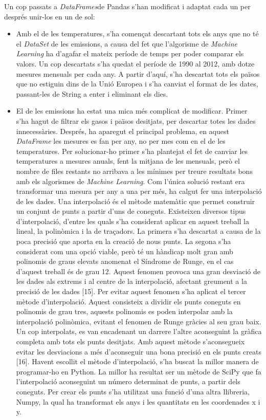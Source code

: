 \documentclass[10pt,a4paper,twocolumn,twoside]{article}
\begin{document}
Un cop passats a \textit{DataFrames}de Pandas s'han modificat i adaptat cada un per després unir-los en un de sol:
\begin{itemize}
\item Amb el de les temperatures, s'ha començat descartant tots els anys que no té el \textit{DataSet} de les emissions, a causa del fet que l'algorisme de \textit{Machine Learning} ha d'agafar el mateix període de temps per poder comparar els valors. Un cop descartats s'ha quedat el període de 1990 al 2012, amb dotze mesures mensuals per cada any. A partir d'aquí, s'ha descartat tots els països que no estiguin dins de la Unió Europea i s'ha canviat el format de les dates, passant-les de String a enter i eliminant els dies.
\item El de les emissions ha estat una mica més complicat de modificar. Primer s'ha hagut de filtrar els gasos i països desitjats, per descartar totes les dades innecessàries. Després, ha aparegut el principal problema, en aquest \textit{DataFrame} les mesures es fan per any, no per mes com en el de les temperatures. Per solucionar-ho primer s'ha plantejat el fet de canviar les temperatures a mesures anuals, fent la mitjana de les mensuals, però el nombre de files restants no arribava a les mínimes per treure resultats bons amb els algorismes de \textit{Machine Learning}. Com l'única solució restant era transformar una mesura per any a una per més, ha calgut fer una interpolació de les dades.
Una interpolació és el mètode matemàtic que permet construir un conjunt de punts a partir d'uns de coneguts. Existeixen diversos tipus d'interpolació, d'entre les quals s'ha considerat aplicar en aquest treball la lineal, la polinòmica i la de traçadors. La primera s'ha descartat a causa de la poca precisió que aporta en la creació de nous punts. La segona s'ha considerat com una opció viable, però té un hàndicap molt gran amb polinomis de graus elevats anomenat el Síndrome de Runge, en el cas d'aquest treball és de grau 12. Aquest fenomen provoca una gran desviació de les dades als extrems i al centre de la interpolació, afectant greument a la precisió de les dades [15]. Per evitar aquest fenomen s'ha aplicat el tercer mètode d'interpolació. Aquest consisteix a dividir els punts coneguts en polinomis de grau tres, aquests polinomis es poden interpolar amb la interpolació polinòmica, evitant el fenomen de Runge gràcies al seu grau baix. Un cop interpolats, es van encadenant un darrere l'altre aconseguint la gràfica completa amb tots els punts desitjats. Amb aquest mètode s'aconsegueix evitar les desviacions a més d'aconseguir una bona precisió en els punts creats [16]. Havent escollit el mètode d'interpolació, s'ha buscat la millor manera de programar-ho en Python. La millor ha resultat ser un mètode de SciPy que fa l'interpolació aconseguint un número determinat de punts, a partir dels coneguts. Per crear els punts s'ha utilitzat una funció d'una altra llibreria, Numpy, la qual ha transformat els anys i les quantitats en les coordenades x i y.
\end{itemize}
\end{document}
